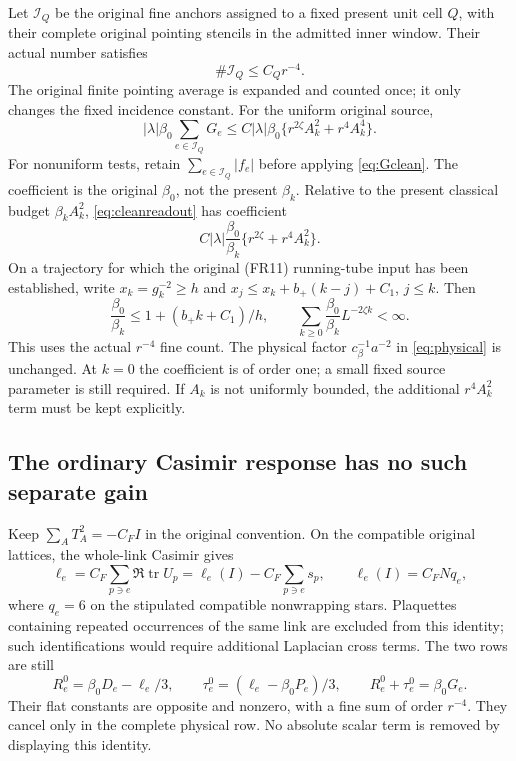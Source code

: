 \documentclass[11pt,letterpaper]{article}
\theoremstyle{remark}\newtheorem{remark}[theorem]{Remark}
\newcommand{\tr}{\operatorname{tr}}
\newcommand{\cB}{c_\beta}\newcommand{\dd}{\,d}
\begin{document}
Let \(\mathcal I_Q\) be the original fine anchors assigned to a fixed present unit cell \(Q\), with their complete original pointing stencils in the admitted inner window. Their actual number satisfies
\[
 \#\mathcal I_Q\le C_Qr^{-4}.
\]
The original finite pointing average is expanded and counted once; it only changes the fixed incidence constant. For the uniform original source,
\begin{equation}\label{eq:cleanreadout}
 \boxed{\quad
 |\lambda|\beta_0\sum_{e\in\mathcal I_Q}G_e
 \le C|\lambda|\beta_0
       \{r^{2\zeta}A_k^2+r^4A_k^4\}.
 \quad}
\end{equation}
For nonuniform tests, retain \(\sum_{e\in\mathcal I_Q}|f_e|\) before applying \eqref{eq:Gclean}. The coefficient is the original \(\beta_0\), not the present \(\beta_k\). Relative to the present classical budget \(\beta_kA_k^2\), \eqref{eq:cleanreadout} has coefficient
\[
 C|\lambda|\frac{\beta_0}{\beta_k}
       \{r^{2\zeta}+r^4A_k^2\}.
\]
On a trajectory for which the original (FR11) running-tube input has been established, write \(x_k=g_k^{-2}\ge h\) and
\(x_j\le x_k+b_+(k-j)+C_1\), \(j\le k\). Then
\begin{equation}\label{eq:cleanseries}
 \frac{\beta_0}{\beta_k}\le1+(b_+k+C_1)/h,
 \qquad
 \sum_{k\ge0}\frac{\beta_0}{\beta_k}L^{-2\zeta k}<\infty.
\end{equation}
This uses the actual \(r^{-4}\) fine count. The physical factor \(\cB^{-1}a^{-2}\) in \eqref{eq:physical} is unchanged. At \(k=0\) the coefficient is of order one; a small fixed source parameter is still required. If \(A_k\) is not uniformly bounded, the additional \(r^4A_k^2\) term must be kept explicitly.

\subsection{The ordinary Casimir response has no such separate gain}

Keep \(\sum_AT_A^2=-C_FI\) in the original convention. On the compatible original lattices, the whole-link Casimir gives
\begin{equation}\label{eq:casimirclean}
 \ell_e=C_F\sum_{p\ni e}\Re\tr U_p
       =\ell_e(I)-C_F\sum_{p\ni e}s_p,
 \qquad \ell_e(I)=C_FNq_e,
\end{equation}
where \(q_e=6\) on the stipulated compatible nonwrapping stars. Plaquettes containing repeated occurrences of the same link are excluded from this identity; such identifications would require additional Laplacian cross terms. The two rows are still
\[
 R_e^0=\beta_0D_e-\ell_e/3,\qquad
 \tau_e^0=(\ell_e-\beta_0P_e)/3,\qquad
 R_e^0+\tau_e^0=\beta_0G_e.
\]
Their flat constants are opposite and nonzero, with a fine sum of order \(r^{-4}\). They cancel only in the complete physical row. No absolute scalar term is removed by displaying this identity.
\end{document}
